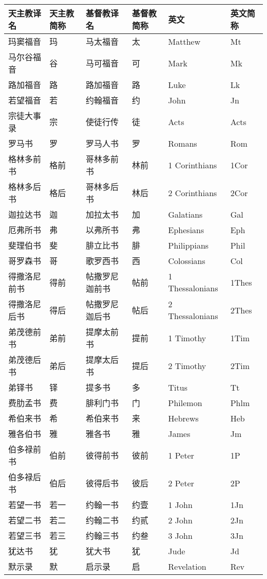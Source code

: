 {
	\scriptsize
	
	\begin{longtable}{|l|l|l|l|l|l|}
		
		\hline 
		\textbf{天主教译名} & \textbf{天主教简称} & \textbf{基督教译名} & \textbf{基督教简称} & \textbf{英文} & \textbf{英文简称} \\ 
		\hline 
		\endhead
		
		玛窦福音 & 玛 & 马太福音 & 太 & Matthew & Mt \\
		\hline
		马尔谷福音 & 谷 & 马可福音 & 可 & Mark & Mk \\
		\hline
		路加福音 & 路 & 路加福音 & 路 & Luke & Lk \\
		\hline
		若望福音 & 若 & 约翰福音 & 约 & John & Jn \\
		\hline
		宗徒大事录 & 宗 & 使徒行传 & 徒 & Acts & Acts \\
		\hline
		罗马书 & 罗 & 罗马人书 & 罗 & Romans & Rom \\
		\hline
		格林多前书 & 格前 & 哥林多前书 & 林前 & 1 Corinthians & 1Cor \\
		\hline
		格林多后书 & 格后 & 哥林多后书 & 林后 & 2 Corinthians & 2Cor \\
		\hline
		迦拉达书 & 迦 & 加拉太书 & 加 & Galatians & Gal \\
		\hline
		厄弗所书 & 弗 & 以弗所书 & 弗 & Ephesians & Eph \\
		\hline
		斐理伯书 & 斐 & 腓立比书 & 腓 & Philippians & Phil \\
		\hline
		哥罗森书 & 哥 & 歌罗西书 & 西 & Colossians & Col \\
		\hline
		得撒洛尼前书 & 得前 & 帖撒罗尼迦前书 & 帖前 & 1 Thessalonians & 1Thes \\
		\hline
		得撒洛尼后书 & 得后 & 帖撒罗尼迦后书 & 帖后 & 2 Thessalonians & 2Thes \\
		\hline
		弟茂德前书 & 弟前 & 提摩太前书 & 提前 & 1 Timothy & 1Tim \\
		\hline
		弟茂德后书 & 弟后 & 提摩太后书 & 提后 & 2 Timothy & 2Tim \\
		\hline
		弟铎书 & 铎 & 提多书 & 多 & Titus & Tt \\
		\hline
		费肋孟书 & 费 & 腓利门书 & 门 & Philemon & Phlm \\
		\hline
		希伯来书 & 希 & 希伯来书 & 来 & Hebrews & Heb \\
		\hline
		雅各伯书 & 雅 & 雅各书 & 雅 & James & Jm \\
		\hline
		伯多禄前书 & 伯前 & 彼得前书 & 彼前 & 1 Peter & 1P \\
		\hline
		伯多禄后书 & 伯后 & 彼得后书 & 彼后 & 2 Peter & 2P \\
		\hline
		若望一书 & 若一 & 约翰一书 & 约壹 & 1 John & 1Jn \\
		\hline
		若望二书 & 若二 & 约翰二书 & 约贰 & 2 John & 2Jn \\
		\hline
		若望三书 & 若三 & 约翰三书 & 约叁 & 3 John & 3Jn \\
		\hline
		犹达书 & 犹 & 犹大书 & 犹 & Jude & Jd \\
		\hline
		默示录 & 默 & 启示录 & 启 & Revelation & Rev \\
		\hline
		
	\end{longtable}
	
}